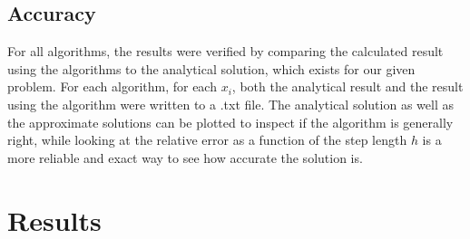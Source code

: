 \documentclass[10pt,a4paper]{article}
\begin{document}
\subsection{Accuracy}
For all algorithms, the results were verified by comparing the calculated result using the algorithms to the analytical solution, which exists for our given problem. For each algorithm, for each $x_i$, both the analytical result and the result using the algorithm were written to a .txt file. The analytical solution as well as the approximate solutions can be plotted to inspect if the algorithm is generally right, while looking at the relative error as a function of the step length $h$ is a more reliable and exact way to see how accurate the solution is. 
\section{Results}
\end{document}
